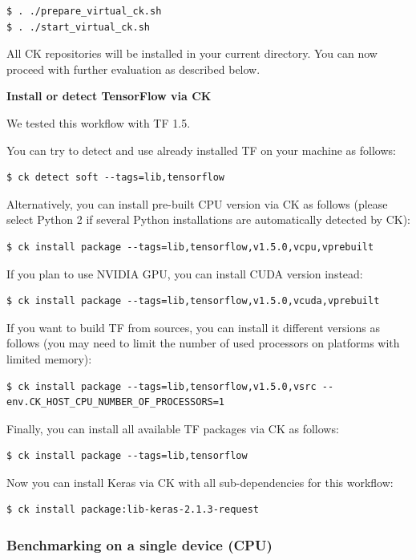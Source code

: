 \documentclass[sigplan]{acmart}
\begin{document}
\begin{verbatim}
$ . ./prepare_virtual_ck.sh
$ . ./start_virtual_ck.sh
\end{verbatim}

All CK repositories will be installed in your current directory.
You can now proceed with further evaluation as described below.

\textbf{Install or detect TensorFlow via CK}

We tested this workflow with TF 1.5. 

You can try to detect and use already installed TF on your machine as follows:
\begin{verbatim}
$ ck detect soft --tags=lib,tensorflow
\end{verbatim}

Alternatively, you can install pre-built CPU version via CK as follows
(please select Python 2 if several Python installations are automatically detected by CK):
\begin{verbatim}
$ ck install package --tags=lib,tensorflow,v1.5.0,vcpu,vprebuilt
\end{verbatim}
If you plan to use NVIDIA GPU, you can install CUDA version instead:
\begin{verbatim}
$ ck install package --tags=lib,tensorflow,v1.5.0,vcuda,vprebuilt
\end{verbatim}

If you want to build TF from sources, you can install it different versions as follows
(you may need to limit the number of used processors on platforms with limited memory):
\begin{verbatim}
$ ck install package --tags=lib,tensorflow,v1.5.0,vsrc --env.CK_HOST_CPU_NUMBER_OF_PROCESSORS=1
\end{verbatim}

Finally, you can install all available TF packages via CK as follows:

\begin{verbatim}
$ ck install package --tags=lib,tensorflow
\end{verbatim}

Now you can install Keras via CK with all sub-dependencies for this workflow:
\begin{verbatim}
$ ck install package:lib-keras-2.1.3-request
\end{verbatim}

\subsubsection{Benchmarking on a single device (CPU)}
\end{document}
